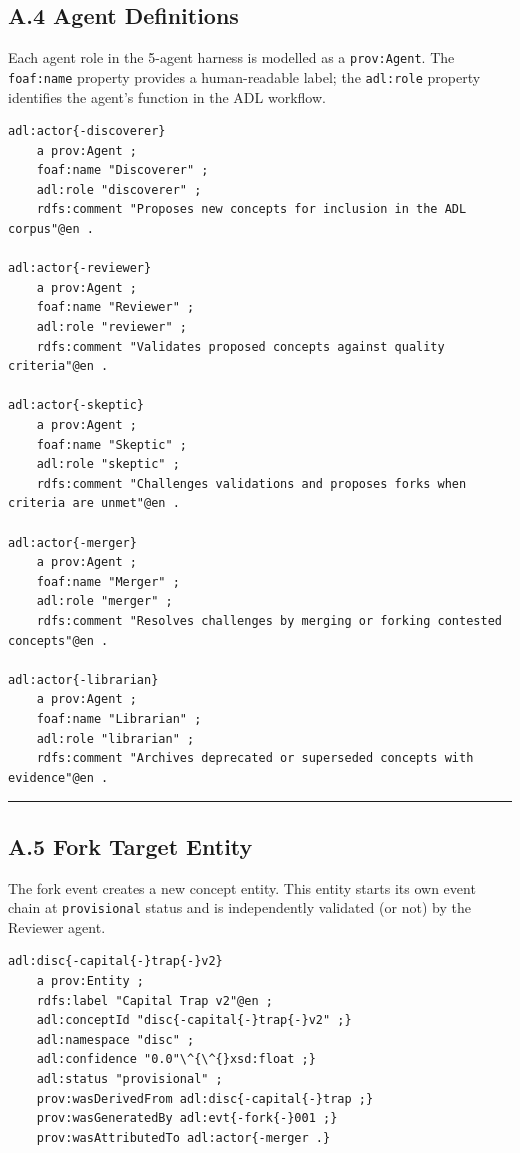 \subsection{A.4 Agent Definitions}\label{a.4-agent-definitions}

Each agent role in the 5-agent harness is modelled as a \texttt{prov:Agent}. The \texttt{foaf:name} property provides a human-readable label; the \texttt{adl:role} property identifies the agent's function in the ADL workflow.

\begin{lstlisting}
adl:actor{-discoverer}
    a prov:Agent ;
    foaf:name "Discoverer" ;
    adl:role "discoverer" ;
    rdfs:comment "Proposes new concepts for inclusion in the ADL corpus"@en .

adl:actor{-reviewer}
    a prov:Agent ;
    foaf:name "Reviewer" ;
    adl:role "reviewer" ;
    rdfs:comment "Validates proposed concepts against quality criteria"@en .

adl:actor{-skeptic}
    a prov:Agent ;
    foaf:name "Skeptic" ;
    adl:role "skeptic" ;
    rdfs:comment "Challenges validations and proposes forks when criteria are unmet"@en .

adl:actor{-merger}
    a prov:Agent ;
    foaf:name "Merger" ;
    adl:role "merger" ;
    rdfs:comment "Resolves challenges by merging or forking contested concepts"@en .

adl:actor{-librarian}
    a prov:Agent ;
    foaf:name "Librarian" ;
    adl:role "librarian" ;
    rdfs:comment "Archives deprecated or superseded concepts with evidence"@en .
\end{lstlisting}

\begin{center}\rule{0.5\linewidth}{0.5pt}\end{center}


\subsection{A.5 Fork Target Entity}\label{a.5-fork-target-entity}

The fork event creates a new concept entity. This entity starts its own event chain at \texttt{provisional} status and is independently validated (or not) by the Reviewer agent.

\begin{lstlisting}
adl:disc{-capital{-}trap{-}v2}
    a prov:Entity ;
    rdfs:label "Capital Trap v2"@en ;
    adl:conceptId "disc{-capital{-}trap{-}v2" ;}
    adl:namespace "disc" ;
    adl:confidence "0.0"\^{\^{}xsd:float ;}
    adl:status "provisional" ;
    prov:wasDerivedFrom adl:disc{-capital{-}trap ;}
    prov:wasGeneratedBy adl:evt{-fork{-}001 ;}
    prov:wasAttributedTo adl:actor{-merger .}
\end{lstlisting}

